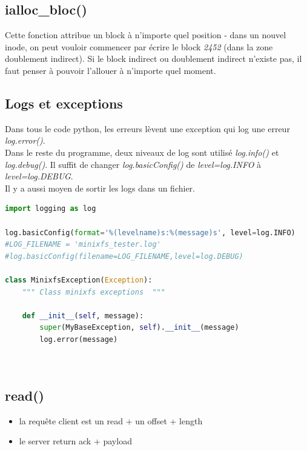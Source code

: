 \documentclass[a4paper,12pt]{article}
\begin{document}
\subsection*{ialloc\_bloc()}

Cette fonction attribue un block à n'importe quel position - dans un nouvel inode, on peut vouloir commencer par écrire le block \emph{2452} (dans la zone doublement indirect). Si le block indirect ou doublement indirect n'existe pas, il faut penser à pouvoir l'allouer à n'importe quel moment.\\

\subsection{Logs et exceptions}

Dans tous le code python, les erreurs lèvent une exception qui log une erreur \emph{log.error()}.\\

Dans le reste du programme, deux niveaux de log sont utilisé \emph{log.info()} et \emph{log.debug()}. Il suffit de changer \emph{log.basicConfig()} de \emph{level=log.INFO} à  \emph{level=log.DEBUG}.\\

Il y a aussi moyen de sortir les logs dans un fichier.\\


\begin{lstlisting}[language=python, caption=initialisation logs et exception MinixfsError()]
import logging as log

log.basicConfig(format='%(levelname)s:%(message)s', level=log.INFO)
#LOG_FILENAME = 'minixfs_tester.log'
#log.basicConfig(filename=LOG_FILENAME,level=log.DEBUG)

class MinixfsException(Exception):
    """ Class minixfs exceptions  """

    def __init__(self, message):
        super(MyBaseException, self).__init__(message)
        log.error(message)
        
        
\end{lstlisting}


\subsection*{read()}

\begin{itemize}
\item la requête client est un read + un offset + length
\item le server return ack + payload
\end{itemize}
\end{document}
